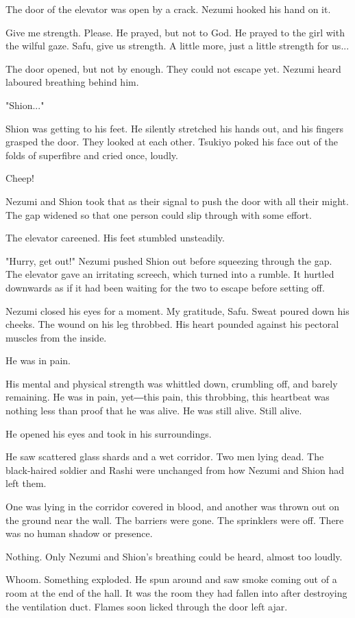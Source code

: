 The door of the elevator was open by a crack. Nezumi hooked his hand on
it.

Give me strength. Please. He prayed, but not to God. He prayed to the
girl with the wilful gaze. Safu, give us strength. A little more, just a
little strength for us...

The door opened, but not by enough. They could not escape yet. Nezumi
heard laboured breathing behind him.

"Shion..."

Shion was getting to his feet. He silently stretched his hands out, and
his fingers grasped the door. They looked at each other. Tsukiyo poked
his face out of the folds of superfibre and cried once, loudly.

Cheep!

Nezumi and Shion took that as their signal to push the door with all
their might. The gap widened so that one person could slip through with
some effort.

The elevator careened. His feet stumbled unsteadily.

"Hurry, get out!" Nezumi pushed Shion out before squeezing through the
gap. The elevator gave an irritating screech, which turned into a
rumble. It hurtled downwards as if it had been waiting for the two to
escape before setting off.

Nezumi closed his eyes for a moment. My gratitude, Safu. Sweat poured
down his cheeks. The wound on his leg throbbed. His heart pounded
against his pectoral muscles from the inside.

He was in pain.

His mental and physical strength was whittled down, crumbling off, and
barely remaining. He was in pain, yet―this pain, this throbbing, this
heartbeat was nothing less than proof that he was alive. He was still
alive. Still alive.

He opened his eyes and took in his surroundings.

He saw scattered glass shards and a wet corridor. Two men lying dead.
The black-haired soldier and Rashi were unchanged from how Nezumi and
Shion had left them.

One was lying in the corridor covered in blood, and another was thrown
out on the ground near the wall. The barriers were gone. The sprinklers
were off. There was no human shadow or presence.

Nothing. Only Nezumi and Shion's breathing could be heard, almost too
loudly.

Whoom. Something exploded. He spun around and saw smoke coming out of a
room at the end of the hall. It was the room they had fallen into after
destroying the ventilation duct. Flames soon licked through the door
left ajar.

